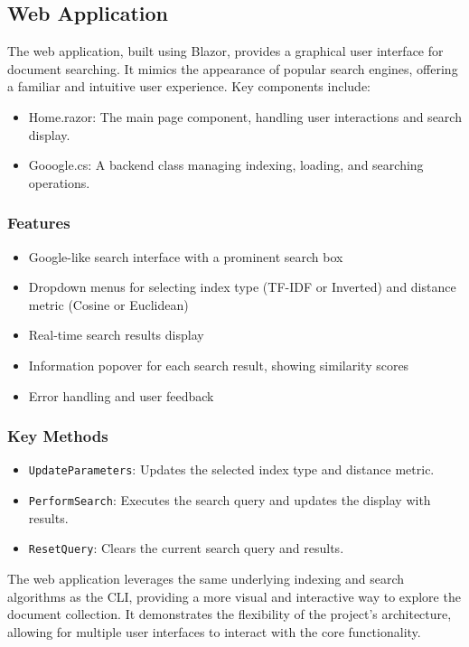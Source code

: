 \documentclass{article}
\begin{document}
\subsection{Web Application}

The web application, built using Blazor, provides a graphical user interface for document searching. It mimics the appearance of popular search engines, offering a familiar and intuitive user experience. Key components include:

\begin{itemize}
    \item Home.razor: The main page component, handling user interactions and search display.
    \item Gooogle.cs: A backend class managing indexing, loading, and searching operations.
\end{itemize}

\subsubsection{Features}
\begin{itemize}
    \item Google-like search interface with a prominent search box
    \item Dropdown menus for selecting index type (TF-IDF or Inverted) and distance metric (Cosine or Euclidean)
    \item Real-time search results display
    \item Information popover for each search result, showing similarity scores
    \item Error handling and user feedback
\end{itemize}

\subsubsection{Key Methods}
\begin{itemize}
    \item \texttt{UpdateParameters}: Updates the selected index type and distance metric.
    \item \texttt{PerformSearch}: Executes the search query and updates the display with results.
    \item \texttt{ResetQuery}: Clears the current search query and results.
\end{itemize}

The web application leverages the same underlying indexing and search algorithms as the CLI, providing a more visual and interactive way to explore the document collection. It demonstrates the flexibility of the project's architecture, allowing for multiple user interfaces to interact with the core functionality.
\end{document}
